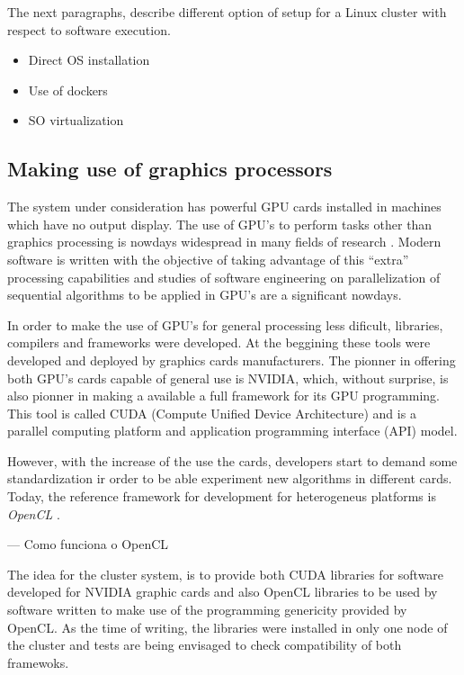\documentclass[twoside,a4paper,12pt,english,draft]{inac17}
\begin{document}
The next paragraphs, describe different option of setup for a Linux cluster with respect to software execution.

\begin{itemize}
\item Direct OS installation
\item Use of dockers
\item SO virtualization
\end{itemize}

\subsection{Making use of graphics processors}

The system under consideration has powerful GPU cards installed in machines
which have no output display. The use of GPU's to perform tasks other than graphics processing
is nowdays widespread in many fields of research \cite{UsoDeGpus}. Modern software is written with
the objective of taking advantage of this ``extra'' processing capabilities and studies of software
engineering on parallelization of sequential algorithms to be applied in GPU's are a significant
nowdays.

In order to make the use of GPU's for general processing less dificult, libraries, compilers and
frameworks were developed. At the beggining these tools were developed and deployed by graphics cards
manufacturers. The pionner in offering both GPU's cards capable of general use is NVIDIA, which,
without surprise, is also pionner in making a available a full framework for its GPU programming.
This tool is called CUDA (Compute Unified Device Architecture) and is a parallel computing platform
and application programming interface (API) model.

However, with the increase of the use the cards, developers start to demand some
standardization ir order to be able experiment new algorithms in different cards. Today, the
reference framework for development for heterogeneus platforms is \textit{OpenCL} \cite{OpenCL}.

--- Como funciona o OpenCL

The idea for the cluster system, is to provide both CUDA libraries for
software developed for NVIDIA graphic cards and also OpenCL libraries to
be used by software written to make use of the programming genericity
provided by OpenCL. As the time of writing, the libraries were installed
in only one node of the cluster and tests are being envisaged to check
compatibility of both framewoks.
\end{document}
